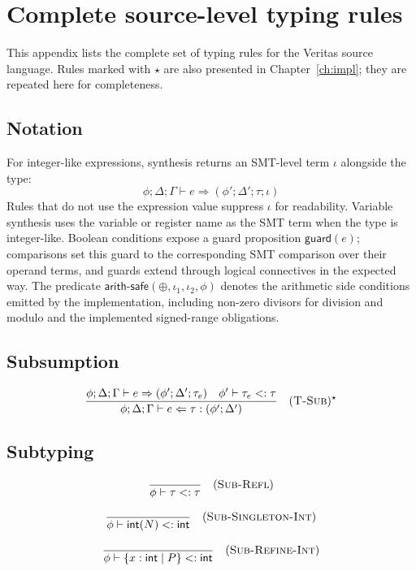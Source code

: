 \appendix
\chapter{Complete source-level typing rules}\label{app:source-rules}

This appendix lists the complete set of typing rules for the Veritas source language. Rules marked with $\star$ are also presented in Chapter~\ref{ch:impl}; they are repeated here for completeness.

\section*{Notation}

For integer-like expressions, synthesis returns an SMT-level term $\iota$ alongside the type:
\[
  \phi;\Delta;\Gamma \vdash e \Rightarrow (\phi';\Delta';\tau;\iota)
\]
Rules that do not use the expression value suppress $\iota$ for readability. Variable synthesis uses the variable or register name as the SMT term when the type is integer-like. Boolean conditions expose a guard proposition $\mathsf{guard}(e)$; comparisons set this guard to the corresponding SMT comparison over their operand terms, and guards extend through logical connectives in the expected way. The predicate $\textsf{arith-safe}(\oplus,\iota_1,\iota_2,\phi)$ denotes the arithmetic side conditions emitted by the implementation, including non-zero divisors for division and modulo and the implemented signed-range obligations.

\section*{Subsumption}

$$\frac{\phi; \Delta; \Gamma \vdash e \Rightarrow (\phi'; \Delta'; \tau_e) \quad \phi' \vdash \tau_e <: \tau}{\phi; \Delta; \Gamma \vdash e \Leftarrow \tau : (\phi'; \Delta')} \quad (\textsc{T-Sub})^\star$$

\section*{Subtyping}

$$\frac{}{\phi \vdash \tau <: \tau} \quad (\textsc{Sub-Refl})$$

$$\frac{}{\phi \vdash \textsf{int}(N) <: \textsf{int}} \quad (\textsc{Sub-Singleton-Int})$$

$$\frac{}{\phi \vdash \{x: \textsf{int} \mid P\} <: \textsf{int}} \quad (\textsc{Sub-Refine-Int})$$

